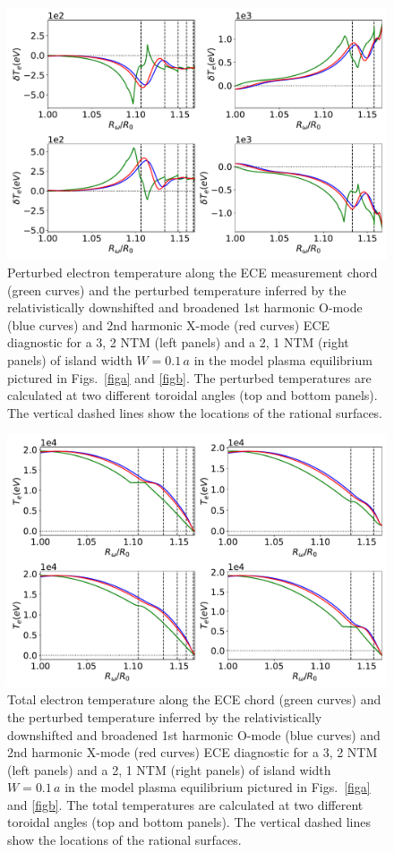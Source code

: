 \documentclass{iopjournal}
\begin{document}
\begin{figure}
\centerline{\includegraphics[width=\textwidth]{Fig16.pdf}}
\caption{Perturbed electron temperature along the ECE measurement chord (green curves) and the perturbed temperature inferred by the relativistically downshifted and  broadened 1st harmonic
O-mode (blue curves) and 2nd harmonic X-mode (red curves) ECE diagnostic for a
3, 2 NTM (left panels) and a 2, 1 NTM (right panels) of island width $W=0.1\,a$ in the model plasma equilibrium pictured in Figs.~\ref{figa} and \ref{figb}.
The perturbed temperatures are calculated  at two different toroidal angles (top and bottom panels). 
The vertical dashed lines show the locations of the rational surfaces. 
\label{fig16}}
\end{figure}

\begin{figure}
\centerline{\includegraphics[width=\textwidth]{Fig17.pdf}}
\caption{Total electron temperature along the ECE chord (green curves) and the perturbed temperature inferred by the relativistically downshifted and broadened 
 1st harmonic
O-mode (blue curves) and 2nd harmonic X-mode (red curves) ECE diagnostic  for a
3, 2 NTM (left panels) and a 2, 1 NTM (right panels) of island width $W=0.1\,a$  in the model plasma equilibrium pictured in Figs.~\ref{figa} and \ref{figb}.
The total temperatures are calculated  at two different toroidal angles (top and bottom panels).  The vertical dashed lines show the locations of the rational surfaces. \label{fig17}}
\end{figure}
\end{document}

